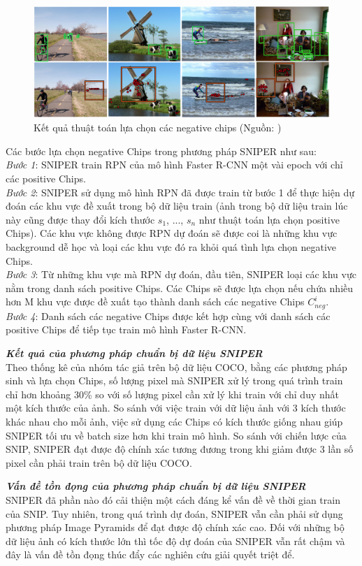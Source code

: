 {    \begin{figure}[H]
        \centering
        \includegraphics[width=13cm] {images/sniper_neg_chip}
        \caption{Kết quả thuật toán lựa chọn các negative chips (Nguồn: \cite{singh2018sniper})}
        \label{fig:sniper_pos_chip}
    \end{figure}

    \noindent
    Các bước lựa chọn negative Chips trong phương pháp SNIPER như sau: \\
    \textit{Bước 1}: SNIPER train RPN của mô hình Faster R-CNN một vài epoch với chỉ các positive Chips. \\
    \textit{Bước 2}: SNIPER sử dụng mô hình RPN đã được train từ bước 1 để thực hiện dự đoán các khu vực đề xuất trong bộ dữ liệu train (ảnh trong bộ dữ liệu train lúc này cũng được thay đổi kích thước {${s}_{1}$, ..., ${s}_{n}$} như thuật toán lựa chọn positive Chips).
    Các khu vực không được RPN dự đoán sẽ được coi là những khu vực background dễ học và loại các khu vực đó ra khỏi quá tình lựa chọn negative Chips. \\
    \textit{Bước 3}: Từ những khu vực mà RPN dự đoán, đầu tiên, SNIPER loại các khu vực nằm trong danh sách positive Chips.
    Các Chips sẽ được lựa chọn nếu chứa nhiều hơn M khu vực được đề xuất tạo thành danh sách các negative Chips ${C}_{neg}^{i}$. \\
    \textit{Bước 4}: Danh sách các negative Chips được kết hợp cùng với danh sách các positive Chips để tiếp tục train mô hình Faster R-CNN.

    \noindent
    \textbf{\textit{Kết quả của phương pháp chuẩn bị dữ liệu SNIPER}} \\
    Theo thống kê của nhóm tác giả trên bộ dữ liệu COCO, bằng các phương pháp sinh và lựa chọn Chips, số lượng pixel mà SNIPER xử lý trong quá trình train chỉ hơn khoảng 30\% so với số lượng pixel cần xử lý khi train với chỉ duy nhất một kích thước của ảnh.
    So sánh với việc train với dữ liệu ảnh với 3 kích thước khác nhau cho mỗi ảnh, việc sử dụng các Chips có kích thước giống nhau giúp SNIPER tối ưu về batch size hơn khi train mô hình.
    So sánh với chiến lược của SNIP, SNIPER đạt được độ chính xác tương đương trong khi giảm được 3 lần số pixel cần phải train trên bộ dữ liệu COCO.

    \noindent
    \textbf{\textit{Vấn đề tồn đọng của phương pháp chuẩn bị dữ liệu SNIPER}} \\
    SNIPER đã phần nào đó cải thiện một cách đáng kể vấn đề về thời gian train của SNIP.
    Tuy nhiên, trong quá trình dự đoán, SNIPER vẫn cần phải sử dụng phương pháp Image Pyramids để đạt được độ chính xác cao.
    Đối với những bộ dữ liệu ảnh có kích thước lớn thì tốc độ dự đoán của SNIPER vẫn rất chậm và đây là vấn đề tồn đọng thúc đẩy các nghiên cứu giải quyết triệt để.
}